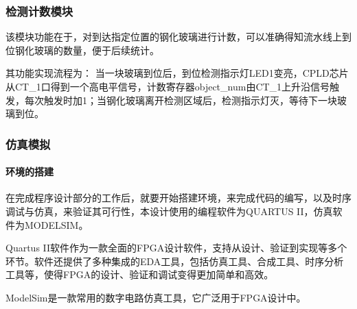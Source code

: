 \subsubsection{检测计数模块}

该模块功能在于，对到达指定位置的钢化玻璃进行计数，可以准确得知流水线上到位钢化玻璃的数量，便于后续统计。\par
其功能实现流程为：
当一块玻璃到位后，到位检测指示灯LED1变亮，CPLD芯片从CT\_1口得到一个高电平信号，计数寄存器object\_num由CT\_1上升沿信号触发，每次触发时加1；当钢化玻璃离开检测区域后，检测指示灯灭，等待下一块玻璃到位。\par
\subsubsection{仿真模拟}
\paragraph{环境的搭建}
在完成程序设计部分的工作后，就要开始搭建环境，来完成代码的编写，以及时序调试与仿真，来验证其可行性，本设计使用的编程软件为QUARTUS II，仿真软件为MODELSIM。\par
Quartus II软件作为一款全面的FPGA设计软件，支持从设计、验证到实现等多个环节。软件还提供了多种集成的EDA工具，包括仿真工具、合成工具、时序分析工具等，使得FPGA的设计、验证和调试变得更加简单和高效。\par
ModelSim是一款常用的数字电路仿真工具，它广泛用于FPGA设计中。\par

